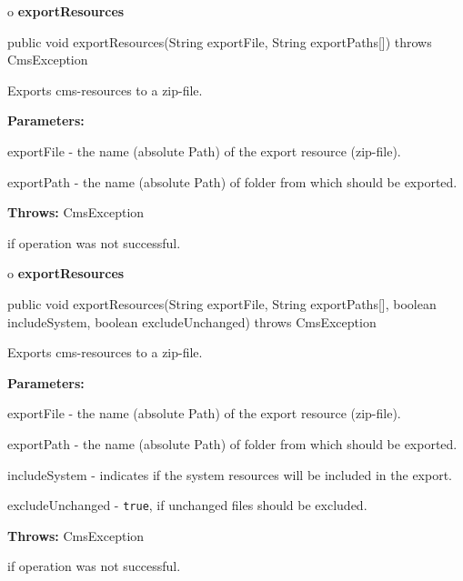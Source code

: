 o {\bf exportResources} 

\begin{PRE}
 public void exportResources(String exportFile,
                             String exportPaths[]) throws CmsException
\end{PRE}

\begin{description}
\htmlDD Exports cms-resources to a zip-file. 

\begin{description}
\item {\bf Parameters:}  

exportFile - the name (absolute Path) of the export resource (zip-file).  

exportPath - the name (absolute Path) of folder from which should be exported.
 
\item {\bf Throws:} CmsException  

if operation was not successful.  
\end{description}

\end{description}

o {\bf exportResources} 

\begin{PRE}
 public void exportResources(String exportFile,
                             String exportPaths[],
                             boolean includeSystem,
                             boolean excludeUnchanged) throws CmsException
\end{PRE}

\begin{description}
\htmlDD Exports cms-resources to a zip-file. 

\begin{description}
\item {\bf Parameters:}  

exportFile - the name (absolute Path) of the export resource (zip-file).  

exportPath - the name (absolute Path) of folder from which should be exported.
 

includeSystem - indicates if the system resources will be included in the
export.  

excludeUnchanged - {\tt true}, if unchanged files should be excluded.  
\item {\bf Throws:} CmsException  

if operation was not successful.  
\end{description}

\end{description}

